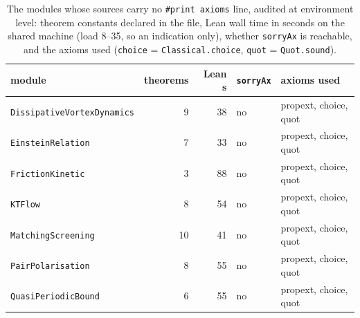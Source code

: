 \begin{table}[tbp]\centering\small\renewcommand{\arraystretch}{1.1}\begin{tabular}{@{}lrrll@{}}\toprule module & theorems & Lean s & \texttt{sorryAx} & axioms used\\\midrule
\texttt{DissipativeVortexDynamics} & 9 & 38 & no & propext, choice, quot \\
\texttt{EinsteinRelation} & 7 & 33 & no & propext, choice, quot \\
\texttt{FrictionKinetic} & 3 & 88 & no & propext, choice, quot \\
\texttt{KTFlow} & 8 & 54 & no & propext, choice, quot \\
\texttt{MatchingScreening} & 10 & 41 & no & propext, choice, quot \\
\texttt{PairPolarisation} & 8 & 55 & no & propext, choice, quot \\
\texttt{QuasiPeriodicBound} & 6 & 55 & no & propext, choice, quot \\
\bottomrule\end{tabular}\caption{The modules whose sources carry no \texttt{\#print axioms} line, audited at environment level: theorem constants declared in the file, Lean wall time in seconds on the shared machine (load 8--35, so an indication only), whether \texttt{sorryAx} is reachable, and the axioms used (\texttt{choice} = \texttt{Classical.choice}, \texttt{quot} = \texttt{Quot.sound}).}\label{ch10:tab-seven}\end{table}
